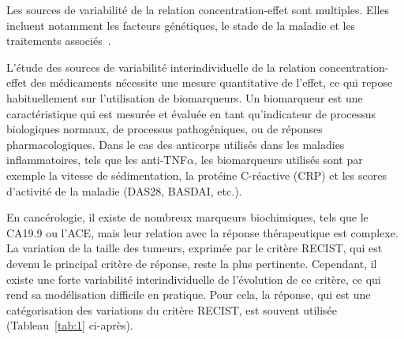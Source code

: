 Les sources de variabilité de la relation concentration-effet sont multiples. Elles incluent notamment les facteurs génétiques, le stade de la maladie et les traitements associés~\citep{REF7}.

L'étude des sources de variabilité interindividuelle de la relation concentration-effet des médicaments nécessite une mesure quantitative de l'effet, ce qui repose habituellement sur l'utilisation de biomarqueurs. Un biomarqueur est une caractéristique qui est mesurée et évaluée en tant qu'indicateur de processus biologiques normaux, de processus pathogéniques, ou de réponses pharmacologiques. Dans le cas des anticorps utilisés dans les maladies inflammatoires, tels que les anti-TNF$\alpha$, les biomarqueurs utilisés sont par exemple la vitesse de sédimentation, la protéine C-réactive (\gls{CRP}) et les scores d'activité de la maladie (DAS28, BASDAI, etc.).

En cancérologie, il existe de nombreux marqueurs biochimiques, tels que le CA19.9 ou l'ACE, mais leur relation avec la réponse thérapeutique est complexe. La variation de la taille des tumeurs, exprimée par le critère RECIST, qui est devenu le principal critère de réponse, reste la plus pertinente. Cependant, il existe une forte variabilité interindividuelle de l'évolution de ce critère, ce qui rend sa modélisation difficile en pratique. Pour cela, la réponse, qui est une catégorisation des variations du critère RECIST, est souvent utilisée  (Tableau~\ref{tab:1} ci-après). 

